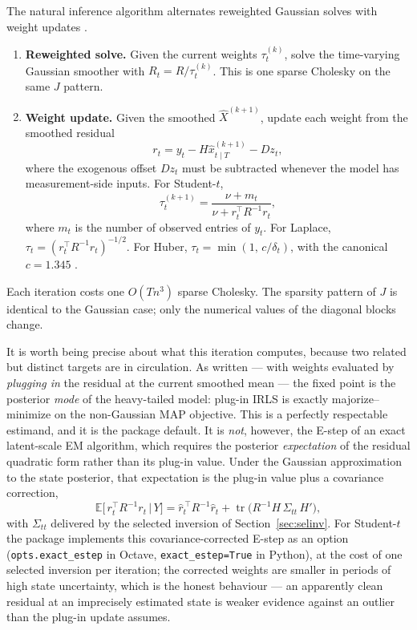 \documentclass[11pt]{article}
\newcommand{\E}{\mathbb E}
\newcommand{\tr}{\operatorname{tr}}
\begin{document}
The natural inference algorithm alternates reweighted Gaussian solves
with weight updates \citep{LangeLittleTaylor1989}.
\begin{enumerate}[leftmargin=2em]
\item \textbf{Reweighted solve.}  Given the current weights $\tau_t^{(k)}$,
  solve the time-varying Gaussian smoother with $R_t = R/\tau_t^{(k)}$.
  This is one sparse Cholesky on the same $J$ pattern.
\item \textbf{Weight update.}  Given the smoothed $\widehat X^{(k+1)}$,
  update each weight from the smoothed residual
  \begin{equation}
  r_t = y_t - H \widehat x_{t\mid T}^{(k+1)} - Dz_t,
  \end{equation}
  where the exogenous offset $Dz_t$ must be subtracted whenever the
  model has measurement-side inputs.  For Student-$t$,
  \begin{equation}
  \tau_t^{(k+1)} = \frac{\nu + m_t}{\nu + r_t^\top R^{-1} r_t},
  \end{equation}
  where $m_t$ is the number of observed entries of $y_t$.  For Laplace,
  $\tau_t = (r_t^\top R^{-1} r_t)^{-1/2}$.  For Huber,
  $\tau_t = \min(1,\, c/\delta_t)$, with the canonical
  $c=1.345$ \citep{HollandWelsch1977}.
\end{enumerate}
Each iteration costs one $O(Tn^3)$ sparse Cholesky.  The sparsity
pattern of $J$ is identical to the Gaussian case; only the numerical
values of the diagonal blocks change.

It is worth being precise about what this iteration computes, because
two related but distinct targets are in circulation.  As written ---
with weights evaluated by \emph{plugging in} the residual at the
current smoothed mean --- the fixed point is the posterior
\emph{mode} of the heavy-tailed model: plug-in IRLS is exactly
majorize--minimize on the non-Gaussian MAP objective.  This is a
perfectly respectable estimand, and it is the package default.  It is
\emph{not}, however, the E-step of an exact latent-scale EM algorithm,
which requires the posterior \emph{expectation} of the residual
quadratic form rather than its plug-in value.  Under the Gaussian
approximation to the state posterior, that expectation is the plug-in
value plus a covariance correction,
\begin{equation}
\E\bigl[\,r_t^\top R^{-1}r_t \,\big|\, Y\bigr]
= \widehat r_t^{\,\top} R^{-1}\widehat r_t
  + \tr\!\bigl(R^{-1}H\,\Sigma_{tt}\,H'\bigr),
\label{eq:exact-estep-meas}
\end{equation}
with $\Sigma_{tt}$ delivered by the selected inversion of
Section~\ref{sec:selinv}.  For Student-$t$ the package implements this
covariance-corrected E-step as an option
(\texttt{opts.exact\_estep} in Octave, \texttt{exact\_estep=True} in
Python), at the cost of one selected inversion per iteration; the
corrected weights are smaller in periods of high state uncertainty,
which is the honest behaviour --- an apparently clean residual at an
imprecisely estimated state is weaker evidence against an outlier than
the plug-in update assumes.
\end{document}
